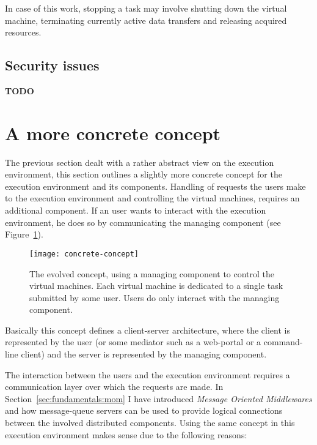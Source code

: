 In  case of  this work,  stopping  a task  may involve  shutting down  the
virtual machine, terminating currently active data transfers and releasing
acquired resources.

\subsection{Security issues}

\textbf{TODO}

\section{A more concrete concept}

The previous  section dealt with a  rather abstract view  on the execution
environment, this  section outlines a  slightly more concrete  concept for
the execution  environment and its  components.  Handling of  requests the
users  make  to the  execution  environment  and  controlling the  virtual
machines, requires an  additional component. If an user  wants to interact
with the execution  environment, he does so by  communicating the managing
component (see Figure~\ref{fig:concrete-concept}).

\begin{figure}[htbp]
  \centering
  \texttt{[image: concrete-concept]}
  \caption[A more concrete concept]{The  evolved concept, using a managing
    component to  control the virtual  machines.  Each virtual  machine is
    dedicated  to a  single task  submitted by  some user.  Users  do only
    interact with the managing component.}
  \label{fig:concrete-concept}
\end{figure}

Basically  this concept  defines a  client-server architecture,  where the
client is represented  by the user (or some mediator  such as a web-portal
or a  command-line client) and the  server is represented  by the managing
component.

\medskip

The interaction between the users and the execution environment requires a
communication   layer   over   which    the   requests   are   made.    In
Section~\ref{sec:fundamentals:mom}   I   have   introduced   \emph{Message
  Oriented  Middlewares} and  how  message-queue servers  can  be used  to
provide logical  connections between the  involved distributed components.
Using the  same concept in this  execution environment makes  sense due to
the following reasons:

